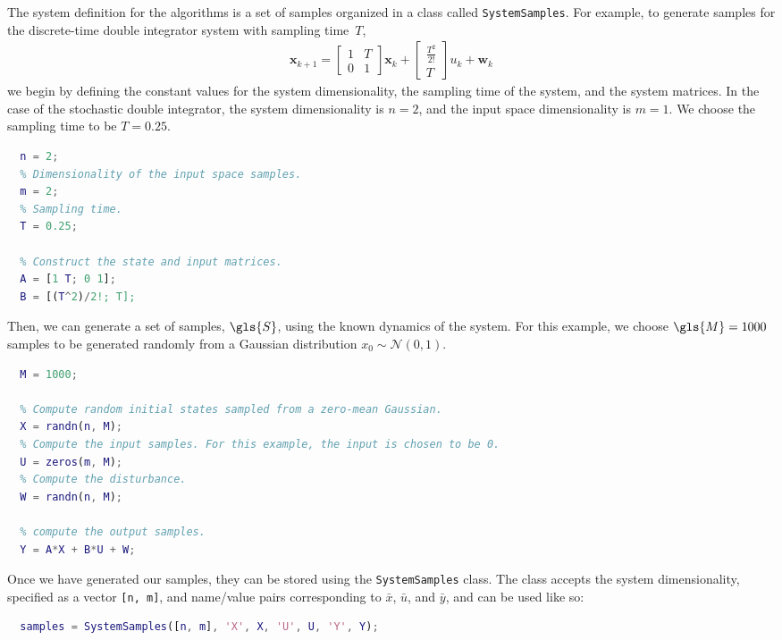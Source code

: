 \documentclass[11pt]{article}
\begin{document}
The system definition for the algorithms is a set of samples organized in a class called \verb|SystemSamples|.
For example, to generate samples for the discrete-time double integrator system
with sampling time~$T$,
\begin{align}
  \boldsymbol{x}_{k+1} =
  \begin{bmatrix}
    1 & T \\
    0 & 1
  \end{bmatrix}
  \boldsymbol{x}_{k} +
  \begin{bmatrix}
    \frac{T^{2}}{2!} \\
    T
  \end{bmatrix}
  u_{k} +
  \boldsymbol{w}_{k}
\end{align}
we begin by defining the constant values for the system dimensionality, the sampling time of the system, and the system matrices. In the case of the stochastic double integrator, the system dimensionality is $n = 2$, and the input space dimensionality is $m = 1$. We choose the sampling time to be $T = 0.25$.
\begin{lstlisting}[language=Matlab]
  % Dimensionality of the state space samples.
  n = 2;
  % Dimensionality of the input space samples.
  m = 2;
  % Sampling time.
  T = 0.25;

  % Construct the state and input matrices.
  A = [1 T; 0 1];
  B = [(T^2)/2!; T];
\end{lstlisting}
Then, we can generate a set of samples, $\gls{S}$, using the known dynamics of the system. For this example, we choose $\gls{M} = 1000$ samples to be generated randomly from a Gaussian distribution $x_{0} \sim \mathcal{N}(0, 1)$.
\begin{lstlisting}[language=Matlab, firstnumber=last]
  % Number of samples.
  M = 1000;

  % Compute random initial states sampled from a zero-mean Gaussian.
  X = randn(n, M);
  % Compute the input samples. For this example, the input is chosen to be 0.
  U = zeros(m, M);
  % Compute the disturbance.
  W = randn(n, M);

  % compute the output samples.
  Y = A*X + B*U + W;
\end{lstlisting}
Once we have generated our samples, they can be stored using the \verb|SystemSamples| class. The class accepts the system dimensionality, specified as a vector \verb|[n, m]|, and name/value pairs corresponding to $\bar{x}$, $\bar{u}$, and $\bar{y}$, and can be used like so:
\begin{lstlisting}[language=Matlab, firstnumber=last]
  % Create a SystemSamples object.
  samples = SystemSamples([n, m], 'X', X, 'U', U, 'Y', Y);
\end{lstlisting}
\end{document}
